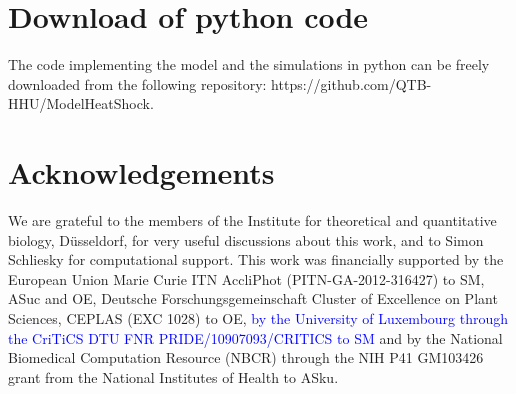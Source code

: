 \documentclass[oneside, 10pt, a4paper, twocolumn]{article}
\begin{document}

%



\section*{Download of python code}

The code implementing the model and the simulations in python can be freely downloaded from the following repository: https://github.com/QTB-HHU/ModelHeatShock.


\section*{Acknowledgements}

We are grateful to the members of the Institute for theoretical and quantitative biology, Düsseldorf, for very useful discussions about this work, and to Simon Schliesky for  computational support.
This work was financially supported by the European Union Marie Curie ITN AccliPhot (PITN-GA-2012-316427) to SM, ASuc and OE, Deutsche Forschungsgemeinschaft Cluster of Excellence on Plant Sciences, CEPLAS (EXC 1028) to OE, \textcolor{blue}{by the University of Luxembourg through the CriTiCS DTU FNR PRIDE/10907093/CRITICS to SM} and by the National Biomedical Computation Resource (NBCR) through the NIH P41 GM103426 grant from the National Institutes of Health to ASku.
\end{document}
